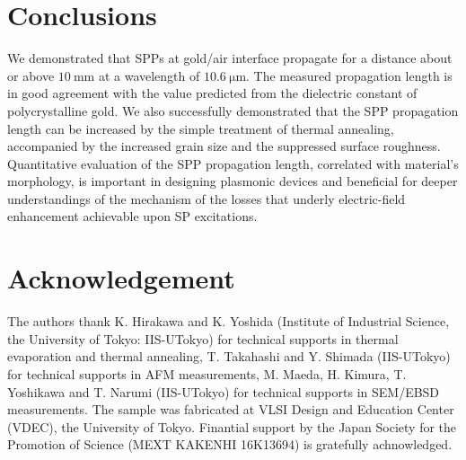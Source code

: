 \documentclass[aip,apl,reprint]{revtex4-1}
\begin{document}
\section{Conclusions}
\label{sec:conclusion}
We demonstrated that SPPs at gold/air interface propagate for a distance about or above $10\:\mathrm{mm}$ at a wavelength of $10.6\:\mathrm{\mu m}$. The measured propagation length is in good agreement with the value predicted from the dielectric constant of polycrystalline gold. We also successfully demonstrated that the SPP propagation length can be increased by the simple treatment of thermal annealing, accompanied by the increased grain size and the suppressed surface roughness. Quantitative evaluation of the SPP propagation length, correlated with material's morphology, is important in designing plasmonic devices and beneficial for deeper understandings of the mechanism of the losses that underly electric-field enhancement achievable upon SP excitations.

\section*{Acknowledgement}
The authors thank K. Hirakawa and K. Yoshida (Institute of Industrial Science, the University of Tokyo: IIS-UTokyo) for technical supports in thermal evaporation and thermal annealing, T. Takahashi and Y. Shimada (IIS-UTokyo) for technical supports in AFM measurements, M. Maeda, H. Kimura, T. Yoshikawa and T. Narumi (IIS-UTokyo) for technical supports in SEM/EBSD measurements.
The sample was fabricated at VLSI Design and Education Center (VDEC), the University of Tokyo. Finantial support by the Japan Society for the Promotion of Science (MEXT KAKENHI 16K13694) is gratefully achnowledged.


\end{document}
